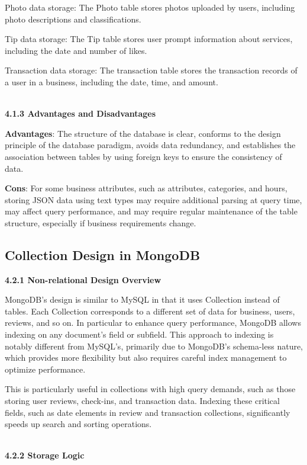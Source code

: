 \documentclass[runningheads]{llncs}
\begin{document}
Photo data storage: The Photo table stores photos uploaded by users, including photo descriptions and classifications.

Tip data storage: The Tip table stores user prompt information about services, including the date and number of likes.

Transaction data storage: The transaction table stores the transaction records of a user in a business, including the date, time, and amount.

\textbf{\\4.1.3 Advantages and Disadvantages\\}

\textbf{Advantages}: The structure of the database is clear, conforms to the design principle of the database paradigm, avoids data redundancy, and establishes the association between tables by using foreign keys to ensure the consistency of data.

\textbf{Cons}: For some business attributes, such as attributes, categories, and hours, storing JSON data using text types may require additional parsing at query time, may affect query performance, and may require regular maintenance of the table structure, especially if business requirements change.



\subsection{Collection Design in MongoDB}

\textbf{4.2.1 Non-relational Design Overview\\}

MongoDB's design is similar to MySQL in that it uses Collection instead of tables. Each Collection corresponds to a different set of data for business, users, reviews, and so on.
In particular to enhance query performance, MongoDB allows indexing on any document's field or subfield. This approach to indexing is notably different from MySQL’s, primarily due to MongoDB’s schema-less nature, which provides more flexibility but also requires careful index management to optimize performance. 

This is particularly useful in collections with high query demands, such as those storing user reviews, check-ins, and transaction data. Indexing these critical fields, such as date elements in review and transaction collections, significantly speeds up search and sorting operations. 

\textbf{\\4.2.2 Storage Logic\\}
\end{document}
